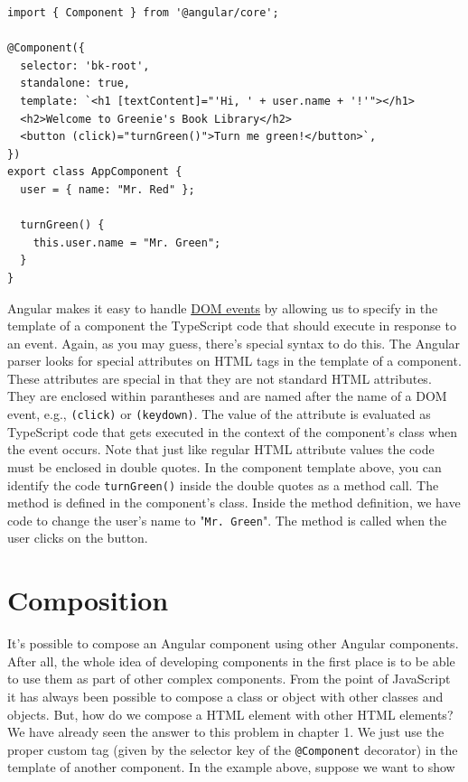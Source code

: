 \documentclass{report}
\begin{document}
\begin{Verbatim}[label=v2.1.4]
import { Component } from '@angular/core';

@Component({
  selector: 'bk-root',
  standalone: true,
  template: `<h1 [textContent]="'Hi, ' + user.name + '!'"></h1>
  <h2>Welcome to Greenie's Book Library</h2>
  <button (click)="turnGreen()">Turn me green!</button>`,
})
export class AppComponent {
  user = { name: "Mr. Red" };

  turnGreen() {
    this.user.name = "Mr. Green";
  }
}
\end{Verbatim}

Angular makes it easy to handle \href{https://developer.mozilla.org/en-US/docs/Web/Events#event_listing}{DOM events} by allowing us to specify in the template of a component the TypeScript code that should execute in response to an event. Again, as you may guess, there's special syntax to do this. The Angular parser looks for special attributes on HTML tags in the template of a component. These attributes are special in that they are not standard HTML attributes. They are enclosed within parantheses and are named after the name of a DOM event, e.g., \verb|(click)| or \verb|(keydown)|. The value of the attribute is evaluated as TypeScript code that gets executed in the context of the component's class when the event occurs. Note that just like regular HTML attribute values the code must be enclosed in double quotes. In the component template above, you can identify the code \verb|turnGreen()| inside the double quotes as a method call. The method is defined in the component's class. Inside the method definition, we have code to change the user's name to "\texttt{Mr. Green}". The method is called when the user clicks on the button.

\section{Composition}
It's possible to compose an Angular component using other Angular components. After all, the whole idea of developing components in the first place is to be able to use them as part of other complex components. From the point of JavaScript it has always been possible to compose a class or object with other classes and objects. But, how do we compose a HTML element with other HTML elements? We have already seen the answer to this problem in chapter 1. We just use the proper custom tag (given by the selector key of the \verb|@Component| decorator) in the template of another component. In the example above, suppose we want to show
\end{document}
